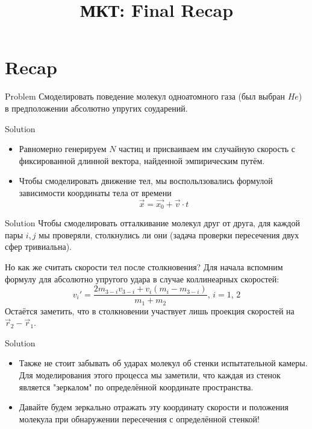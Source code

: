 \documentclass{beamer}
\title{МКТ: Final Recap}
\begin{document}
\begin{frame}
  \titlepage
\end{frame}

\section{Recap}

\begin{frame}{Problem}
  Смоделировать поведение молекул одноатомного газа (был выбран $He$) в предположении абсолютно упругих соударений. 
\end{frame}

\begin{frame}{Solution}
  \begin{itemize}
    \item<1-> Равномерно генерируем $N$ частиц и присваиваем им случайную скорость с фиксированной длинной вектора, найденной эмпирическим путём.
    \item<2-> Чтобы смоделировать движение тел, мы воспольлзовались формулой зависимости координаты тела от времени
    \[
      \overrightarrow{x} = \overrightarrow{x_0} + \overrightarrow{v} \cdot t 
    \] 
  \end{itemize}
\end{frame}

\begin{frame}{Solution}
  Чтобы смоделировать отталкивание молекул друг от друга, для каждой пары  $i, j$ мы проверяли, столкнулись ли они (задача проверки пересечения двух сфер тривиальна). 
  
  Но как же считать скорости тел после столкновения? Для начала вспомним формулу для абсолютно упругого удара в случае коллинеарных скоростей:
  \[
    v_i' = \frac{2m_{3 - i}v_{3 - i} + v_i(m_i - m_{3 - i})}{m_1 + m_2},\, i = 1,\,2
  \]
  Остаётся заметить, что в столкновении участвует лишь проекция скоростей на $\vec{r}_2 - \vec{r}_1$.
\end{frame}

\begin{frame}{Solution}
  \begin{itemize}
    \item<1-> Также не стоит забывать об ударах молекул об стенки испытательной камеры. Для моделирования этого процесса мы заметили, что каждая из стенок является "зеркалом" по определённой координате пространства.
    \item<2-> Давайте будем зеркально отражать эту координату скорости и положения молекула при обнаружении пересечения с определённой стенкой!
  \end{itemize}
\end{frame}
\end{document}

